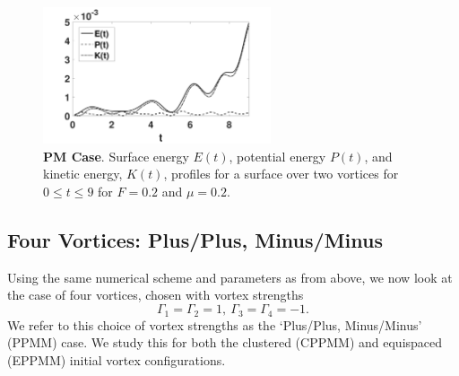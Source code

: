 \documentclass[a4paper,11pt]{article}
\begin{document}
%
\begin{figure}[!h]
\centering
\includegraphics[width=0.6\textwidth]{energy_profile_mu_pt2_F_pt2_tv}
\caption{\small {\bf PM Case}. Surface energy $E(t)$, potential energy $P(t)$, and kinetic energy, $K(t)$, profiles for a surface over two vortices for $0\leq t \leq 9$ for $F=0.2$ and $\mu=0.2$.}
\label{fig:eprof_tv}
\end{figure}

\subsection{Four Vortices: Plus/Plus, Minus/Minus}
Using the same numerical scheme and parameters as from above, we now look at the case of four vortices, chosen with vortex strengths
\[
\Gamma_{1}=\Gamma_{2}=1, ~ \Gamma_{3}=\Gamma_{4}=-1.
\]
We refer to this choice of vortex strengths as the `Plus/Plus, Minus/Minus' (PPMM) case.  We study this for both the clustered (CPPMM) and equispaced (EPPMM) initial vortex configurations.  
\end{document}
